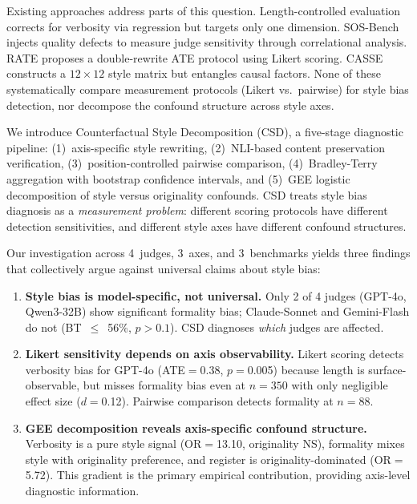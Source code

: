 \documentclass[11pt,a4paper]{article}
\begin{document}
Existing approaches address parts of this question. Length-controlled evaluation \citep{lcalpacaeval2025} corrects for verbosity via regression but targets only one dimension. SOS-Bench \citep{sosbench2025} injects quality defects to measure judge sensitivity through correlational analysis. RATE \citep{rate2025} proposes a double-rewrite ATE protocol using Likert scoring. CASSE \citep{casse2026} constructs a $12 \times 12$ style matrix but entangles causal factors. None of these systematically compare measurement protocols (Likert vs.\ pairwise) for style bias detection, nor decompose the confound structure across style axes.

We introduce Counterfactual Style Decomposition (CSD), a five-stage diagnostic pipeline: (1)~axis-specific style rewriting, (2)~NLI-based content preservation verification, (3)~position-controlled pairwise comparison, (4)~Bradley-Terry aggregation with bootstrap confidence intervals, and (5)~GEE logistic decomposition of style versus originality confounds. CSD treats style bias diagnosis as a \emph{measurement problem}: different scoring protocols have different detection sensitivities, and different style axes have different confound structures.

Our investigation across 4~judges, 3~axes, and 3~benchmarks yields three findings that collectively argue against universal claims about style bias:

\begin{enumerate}
    \item \textbf{Style bias is model-specific, not universal.} Only 2 of 4 judges (GPT-4o, Qwen3-32B) show significant formality bias; Claude-Sonnet and Gemini-Flash do not (BT~$\leq$~56\%, $p>0.1$). CSD diagnoses \emph{which} judges are affected.

    \item \textbf{Likert sensitivity depends on axis observability.} Likert scoring detects verbosity bias for GPT-4o (ATE$=$0.38, $p{=}$0.005) because length is surface-observable, but misses formality bias even at $n{=}350$ with only negligible effect size ($d{=}$0.12). Pairwise comparison detects formality at $n{=}88$.

    \item \textbf{GEE decomposition reveals axis-specific confound structure.} Verbosity is a pure style signal (OR$=$13.10, originality NS), formality mixes style with originality preference, and register is originality-dominated (OR$=$5.72). This gradient is the primary empirical contribution, providing axis-level diagnostic information.
\end{enumerate}
\end{document}

